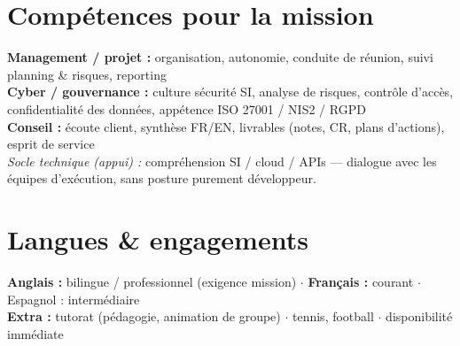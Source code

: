 \documentclass[letterpaper,10.5pt]{article}
\begin{document}
\section{Comp\'etences pour la mission}
\small{
\textbf{Management / projet :} organisation, autonomie, conduite de r\'eunion, suivi planning \& risques, reporting \\
\textbf{Cyber / gouvernance :} culture s\'ecurit\'e SI, analyse de risques, contr\^ole d'acc\`es, confidentialit\'e des donn\'ees, app\'etence ISO 27001 / NIS2 / RGPD \\
\textbf{Conseil :} \'ecoute client, synth\`ese FR/EN, livrables (notes, CR, plans d'actions), esprit de service \\
\textit{Socle technique (appui) :} compr\'ehension SI / cloud / APIs --- dialogue avec les \'equipes d'ex\'ecution, sans posture purement d\'eveloppeur.
}
\section{Langues \& engagements}
\small{\textbf{Anglais :} bilingue / professionnel (exigence mission) $\cdot$ \textbf{Fran\c{c}ais :} courant $\cdot$ Espagnol : interm\'ediaire \\
\textbf{Extra :} tutorat (p\'edagogie, animation de groupe) $\cdot$ tennis, football $\cdot$ disponibilit\'e imm\'ediate}
\end{document}
